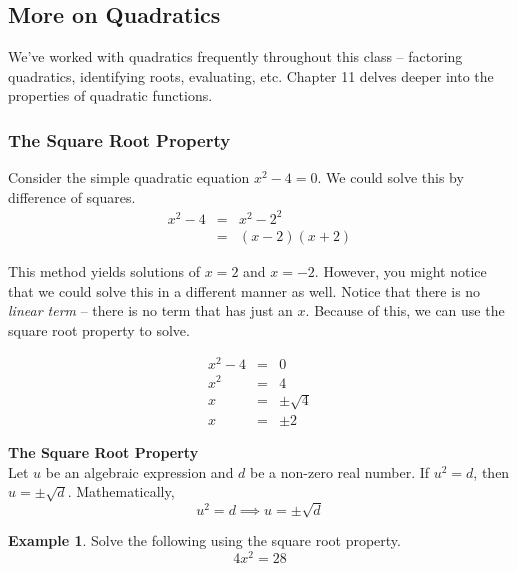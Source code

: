\documentclass[addpoints,12pt]{exam}
\theoremstyle{definition}
\theoremstyle{break}
\theoremstyle{break}
\newtheorem{example}{Example}[subsection]
\begin{document}
\setcounter{section}{11}
\setcounter{subsection}{0}

\subsection{More on Quadratics}
We've worked with quadratics frequently throughout this class -- factoring quadratics, identifying roots, evaluating, etc. Chapter 11 delves deeper into the properties of quadratic functions.
\vspace{.2in}
\subsubsection*{The Square Root Property}

Consider the simple quadratic equation $x^2-4=0$. We could solve this by difference of squares.
\begin{eqnarray*}
x^2 - 4 &=& x^2 - 2^2\\
&=& (x-2)(x+2)
\end{eqnarray*}

This method yields solutions of $x=2$ and $x=-2$. However, you might notice that we could solve this in a different manner as well. Notice that there is no \emph{linear term} -- there is no term that has just an $x$. Because of this, we can use the square root property to solve.

\begin{eqnarray*}
x^2 - 4 &=& 0\\
x^2 &=& 4\\
x &=& \pm\sqrt{4}\\
x &=& \pm 2
\end{eqnarray*}

\vspace{.2in}

\begin{mdframed}
\textbf{The Square Root Property}\mbox{}\\
Let $u$ be an algebraic expression and $d$ be a non-zero real number. If $u^2 = d$, then $u=\pm\sqrt{d}$. Mathematically, \[u^2=d \implies u=\pm\sqrt{d}\]
\end{mdframed}

\vspace{.2in}

\begin{example}
Solve the following using the square root property.
\[ 4x^2 = 28\]
\vspace{1.5in}
\end{example}
\end{document}
